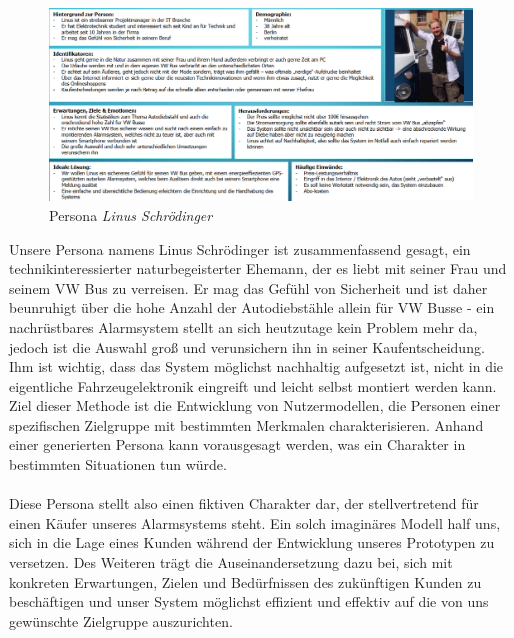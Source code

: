 \begin{figure} [H]
	\begin{center}
		\includegraphics[width=1\textwidth]{Bilder/Konzept_Persona.png}
		\caption{Persona \textit{Linus Schrödinger}}
		\label{persona}
	\end{center}
\end{figure}
Unsere Persona namens Linus Schrödinger ist zusammenfassend gesagt, ein technikinteressierter naturbegeisterter Ehemann, der es liebt mit seiner Frau und seinem VW Bus zu verreisen. Er mag das Gefühl von Sicherheit und ist daher beunruhigt über die hohe Anzahl der Autodiebstähle allein für VW Busse - ein nachrüstbares Alarmsystem stellt an sich heutzutage kein Problem mehr da, jedoch ist die Auswahl groß und verunsichern ihn in seiner Kaufentscheidung. Ihm ist wichtig, dass das System möglichst nachhaltig aufgesetzt ist, nicht in die eigentliche Fahrzeugelektronik eingreift und leicht selbst montiert werden kann.
\\
Ziel dieser Methode ist die Entwicklung von Nutzermodellen, die Personen einer spezifischen Zielgruppe mit bestimmten Merkmalen charakterisieren. Anhand einer generierten Persona kann vorausgesagt werden, was ein Charakter in bestimmten Situationen tun würde. \cite{JosefineLepzien}
\\
\\
Diese Persona stellt also einen fiktiven Charakter dar, der stellvertretend für einen Käufer unseres Alarmsystems steht. Ein solch imaginäres Modell half uns, sich in die Lage eines Kunden während der Entwicklung unseres Prototypen zu versetzen. Des Weiteren trägt die Auseinandersetzung dazu bei, sich mit konkreten Erwartungen, Zielen und Bedürfnissen des zukünftigen Kunden zu beschäftigen und unser System möglichst effizient und effektiv auf die von uns gewünschte Zielgruppe auszurichten.


